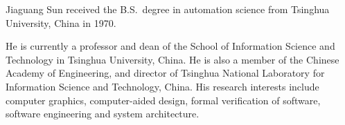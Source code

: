\documentclass[journal]{IEEEtranTIE}
\begin{document}
\vspace{-5mm}
\begin{IEEEbiography}%
{Jiaguang Sun} received the B.S.\ degree in automation science from
Tsinghua University, China in 1970.  

He is currently a professor and dean of the School of Information
Science and Technology in Tsinghua University, China. He is also a
member of the Chinese Academy of Engineering, and director of Tsinghua
National Laboratory for Information Science and Technology, China.
His research interests include computer graphics, computer-aided
design, formal verification of software, software engineering and
system architecture.
\end{IEEEbiography}
\end{document}
